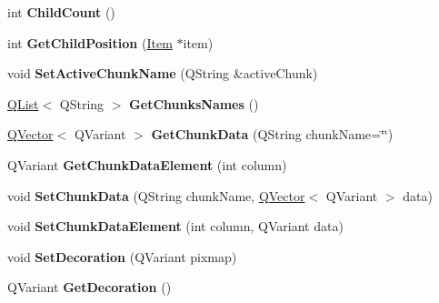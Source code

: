 \begin{DoxyCompactItemize}
\item 
int {\bfseries Child\+Count} ()\hypertarget{class_item_a9324d6e789340e65394bea357954e6e1}{}\label{class_item_a9324d6e789340e65394bea357954e6e1}

\item 
int {\bfseries Get\+Child\+Position} (\hyperlink{class_item}{Item} $\ast$item)\hypertarget{class_item_afccf539d108a9b083b67105ccb548f11}{}\label{class_item_afccf539d108a9b083b67105ccb548f11}

\item 
void {\bfseries Set\+Active\+Chunk\+Name} (Q\+String \&active\+Chunk)\hypertarget{class_item_accef83c1103296fc80b30a809e7ae293}{}\label{class_item_accef83c1103296fc80b30a809e7ae293}

\item 
\hyperlink{class_q_list}{Q\+List}$<$ Q\+String $>$ {\bfseries Get\+Chunks\+Names} ()\hypertarget{class_item_ab50d988f2abaaa6a0803b1d35d239220}{}\label{class_item_ab50d988f2abaaa6a0803b1d35d239220}

\item 
\hyperlink{class_q_vector}{Q\+Vector}$<$ Q\+Variant $>$ {\bfseries Get\+Chunk\+Data} (Q\+String chunk\+Name=\char`\"{}\char`\"{})\hypertarget{class_item_af0ee587a5f74c92bd4d9a902a6a7e0d3}{}\label{class_item_af0ee587a5f74c92bd4d9a902a6a7e0d3}

\item 
Q\+Variant {\bfseries Get\+Chunk\+Data\+Element} (int column)\hypertarget{class_item_a6f25765ce2c56248e04d04ebec90d34d}{}\label{class_item_a6f25765ce2c56248e04d04ebec90d34d}

\item 
void {\bfseries Set\+Chunk\+Data} (Q\+String chunk\+Name, \hyperlink{class_q_vector}{Q\+Vector}$<$ Q\+Variant $>$ data)\hypertarget{class_item_a0617312073b3d751518cfd6269c25c0a}{}\label{class_item_a0617312073b3d751518cfd6269c25c0a}

\item 
void {\bfseries Set\+Chunk\+Data\+Element} (int column, Q\+Variant data)\hypertarget{class_item_a2206a4c379b351c9cbbe2406399d2b30}{}\label{class_item_a2206a4c379b351c9cbbe2406399d2b30}

\item 
void {\bfseries Set\+Decoration} (Q\+Variant pixmap)\hypertarget{class_item_ab0fa052dc1e0dc785767d25a6010ea13}{}\label{class_item_ab0fa052dc1e0dc785767d25a6010ea13}

\item 
Q\+Variant {\bfseries Get\+Decoration} ()\hypertarget{class_item_ad74957af2eb1996ebdcece4ccdb11c4d}{}\label{class_item_ad74957af2eb1996ebdcece4ccdb11c4d}


\end{DoxyCompactItemize}
